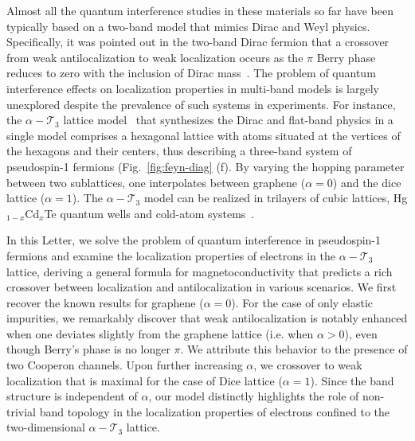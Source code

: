 \documentclass[aps,prb,amsmath,amssymb,footinbib,showpacs,twocolumn]{revtex4-2}
\begin{document}
Almost all the quantum interference studies in these materials so far have been typically based on a two-band model that mimics Dirac and Weyl physics. Specifically, it was pointed out in the two-band Dirac fermion that a crossover from weak antilocalization to weak localization occurs as the $\pi$ Berry phase reduces to zero with the inclusion of Dirac mass~\cite{lu2011competition}. The problem of quantum interference effects on localization properties in multi-band models is largely unexplored despite the prevalence of such systems in experiments. For instance, the $\alpha-\mathcal{T}_3$ lattice model~\cite{raoux2014dia} that synthesizes the Dirac and flat-band physics in a single model comprises a hexagonal lattice with atoms situated at the vertices of the hexagons and their centers, thus describing a three-band system of pseudospin-1 fermions (Fig.~\ref{fig:feyn-diag} (f). By varying the hopping parameter between two sublattices, one interpolates between graphene ($\alpha=0$) and the dice lattice ($\alpha=1$). The $\alpha-\mathcal{T}_3$ model can be realized in trilayers of cubic lattices, Hg$_{1-x}$Cd$_x$Te quantum wells and cold-atom systems~\cite{wang2011nearly, rizzi2006phase, malcolm2015magneto, serret2002vortex}.

In this Letter, we solve the problem of quantum interference in pseudospin-1 fermions and examine the localization properties of electrons in the $\alpha-\mathcal{T}_3$ lattice, deriving a general formula for magnetoconductivity that predicts a rich crossover between localization and antilocalization in various scenarios. We first recover the known results for graphene ($\alpha=0$). For the case of only elastic impurities, we remarkably discover that weak antilocalization is notably enhanced when one deviates slightly from the graphene lattice (i.e. when $\alpha>0$), even though Berry's phase is no longer $\pi$. We attribute this behavior to the presence of two Cooperon channels.
Upon further increasing $\alpha$, we crossover to weak localization that is maximal for the case of Dice lattice ($\alpha=1$). Since the band structure is independent of $\alpha$, our model distinctly highlights the role of non-trivial band topology in the localization properties of electrons confined to the two-dimensional $\alpha-\mathcal{T}_3$ lattice.
\end{document}
